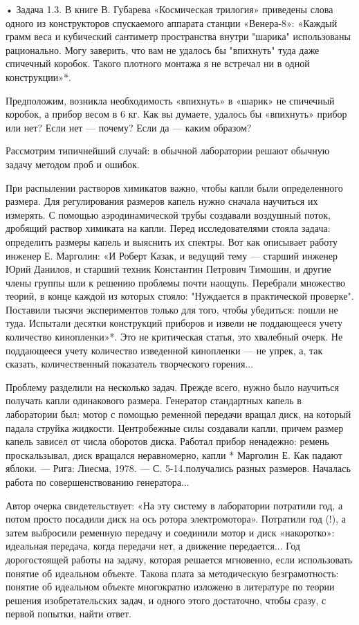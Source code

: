 • Задача  1.3. В  книге В.  Губарева «Космическая  трилогия» приведены
слова одного из конструкторов спускаемого аппарата станции «Венера-8»:
«Каждый грамм веса и кубический сантиметр пространства внутри "шарика"
использованы  рационально.  Могу  заверить,  что  вам  не  удалось  бы
"впихнуть" туда даже  спичечный коробок. Такого плотного  монтажа я не
встречал ни в одной конструкции»*.


Предположим, возникла необходимость «впихнуть»  в «шарик» не спичечный
коробок, а прибор весом в 6  кг. Как вы думаете, удалось бы «впихнуть»
прибор или нет? Если нет — почему? Если да — каким образом?


Рассмотрим типичнейший  случай: в  обычной лаборатории  решают обычную
задачу методом проб и ошибок.

При   распылении  растворов   химикатов   важно,   чтобы  капли   были
определенного  размера.   Для  регулирования  размеров   капель  нужно
сначала  научиться  их  измерять.  С  помощью  аэродинамической  трубы
создавали воздушный  поток, дробящий раствор химиката  на капли. Перед
исследователями стояла задача: определить размеры капель и выяснить их
спектры.  Вот как  описывает  работу инженер  Е.  Марголин: «И  Роберт
Казак, и ведущий тему — старший инженер Юрий Данилов, и старший техник
Константин  Петрович Тимошин,  и  другие члены  группы  шли к  решению
проблемы почти наощупь. Перебрали множество  теорий, в конце каждой из
которых стояло: "Нуждается в  практической проверке". Поставили тысячи
экспериментов  только  для  того,  чтобы  убедиться:  пошли  не  туда.
Испытали десятки  конструкций приборов  и извели не  поддающееся учету
количество  кинопленки»*. Это  не  критическая  статья, это  хвалебный
очерк.  Не  поддающееся  учету   количество  изведенной  кинопленки  —
не  упрек,  а,  так  сказать,  количественный  показатель  творческого
горения...

Проблему  разделили  на  несколько  задач. Прежде  всего,  нужно  было
научиться  получать капли  одинакового размера.  Генератор стандартных
капель в  лаборатории был:  мотор с  помощью ременной  передачи вращал
диск, на который падала  струйка жидкости. Центробежные силы создавали
капли, причем размер  капель зависел от числа  оборотов диска. Работал
прибор  ненадежно: ремень  проскальзывал, диск  вращался неравномерно,
капли *  Марголин Е.  Как падают  яблоки. — Рига:  Лиесма, 1978.  — С.
5-14.получались разных размеров.  Началась работа по совершенствованию
генератора...

Автор очерка свидетельствует: «На  эту систему в лаборатории потратили
год,  а  потом просто  посадили  диск  на ось  ротора  электромотора».
Потратили год  (!), а  затем выбросили  ременную передачу  и соединили
мотор  и диск  «накоротко»:  идеальная передача,  когда передачи  нет,
а  движение   передается...  Год   дорогостоящей  работы   на  задачу,
которая  решается мгновенно,  если использовать  понятие об  идеальном
объекте.  Такова  плата  за методическую  безграмотность:  понятие  об
идеальном объекте многократно изложено  в литературе по теории решения
изобретательских  задач, и  одного  этого достаточно,  чтобы сразу,  с
первой попытки, найти ответ.


